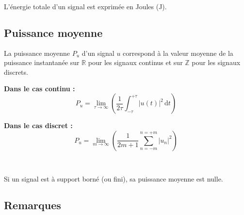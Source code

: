 \vspace{0.5cm}

L'énergie totale d'un signal est exprimée en Joules (J).

\subsection{Puissance moyenne}

La puissance moyenne $P_u$ d'un signal $u$ correspond à la valeur moyenne de la puissance instantanée sur $\mathbb{R}$ pour les signaux continus et sur $\mathbb{Z}$ pour les signaux discrets. \\

\begin{minipage}[t]{0.45\textwidth}
\textbf{Dans le cas continu :} \\
\begin{equation}
	P_u = \lim_{\tau \rightarrow \infty} \left( \dfrac{1}{2\tau} \int_{-\tau}^{+\tau} | u(t) |^2\,\mathrm{d}t \right)
\end{equation}
\end{minipage}
\hfill\vline\hfill
\begin{minipage}[t]{0.45\textwidth}
\textbf{Dans le cas discret :} \\
\begin{equation}
	P_u = \lim_{m \rightarrow \infty} \left( \dfrac{1}{2m+1}\sum_{n=-m}^{n=+m} |u_n|^2 \right)
\end{equation}
\end{minipage} \\

\vspace{0.5cm}

Si un signal est à support borné (ou fini), sa puissance moyenne est nulle. 

\subsection{Remarques}

